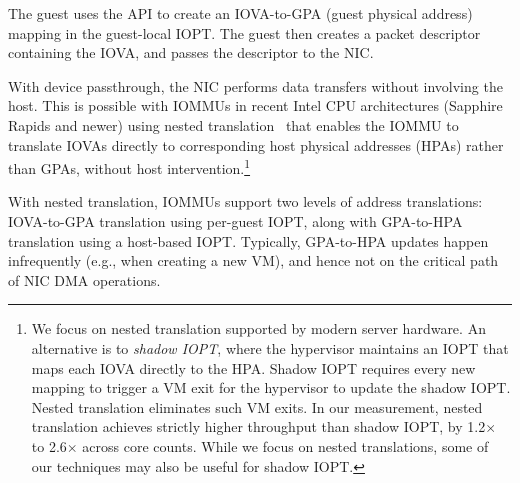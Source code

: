 


The guest uses the  API to create an IOVA-to-GPA (guest physical address) 
    mapping in the guest-local IOPT. 
The guest then creates a packet descriptor containing the IOVA, and passes 
    the descriptor to the NIC.

With device passthrough, the NIC performs data transfers without involving the host. This is possible with IOMMUs in recent Intel CPU architectures (Sapphire Rapids and newer) using 
    nested translation~\cite{intel_vtd_spec} that enables the  
    IOMMU to translate IOVAs directly to corresponding host physical addresses (HPAs) rather than GPAs,
    without host intervention.\footnote{We focus on nested translation supported by modern server hardware. 
    An alternative is to {\it shadow IOPT}, where the hypervisor 
    maintains an IOPT that maps each IOVA directly to the HPA.
    Shadow IOPT requires every new mapping to trigger a VM exit 
    for the hypervisor to update the shadow IOPT. Nested translation eliminates such VM exits.
    In our measurement, nested translation achieves strictly higher throughput than shadow IOPT,
    by 1.2$\times$ to 2.6$\times$ across core counts. 
    While we focus on nested translations, some of our techniques may also be useful for shadow IOPT.} 

With nested translation, IOMMUs support two levels of address translations: 
    IOVA-to-GPA translation using per-guest IOPT, along with GPA-to-HPA translation 
    using a host-based IOPT. 
Typically, GPA-to-HPA updates happen infrequently (e.g., when creating a new VM), 
    and hence not on the critical path of NIC DMA operations. 
\fi


